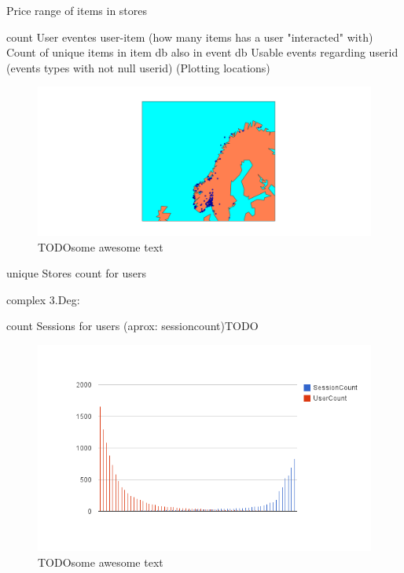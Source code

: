         Price range of items in stores



        count User eventes
        user-item (how many items has a user "interacted" with)
        Count of unique items in item db also in event db
        Usable events regarding userid (events types with not null userid)
        (Plotting locations)

\begin{figure}[H]
    \includegraphics[width=5in]{image/simpleGeoPlot.png}
    \centering
    \caption[Simple plotting of event location]{TODOsome awesome text}
\end{figure}


        unique Stores count for users

    complex 3.Deg:

        count Sessions for users (aprox: sessioncount)TODO

\begin{figure}[H]
    \includegraphics[width=5in]{image/global_sessioncount.png}
    \centering
    \caption[Count of sessions per user mapped with count of user with give
    session amount]{TODOsome awesome text}
\end{figure}


